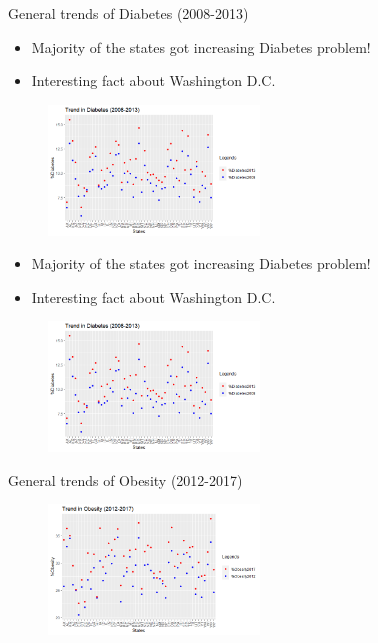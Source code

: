 \documentclass{beamer} %
\begin{document}
\begin{frame}{General trends of Diabetes (2008-2013)}

  \begin{itemize}
    \item Majority of the states got increasing Diabetes problem!
    \item Interesting fact about Washington D.C.
  \end{itemize}
  \begin{figure}
    \includegraphics[width=0.5\textwidth]{DiaTrend.png}
    \hfill
  \end{figure}

 \begin{itemize}
  \item Majority of the states got increasing Diabetes problem!
  \item Interesting fact about Washington D.C.
 \end{itemize}
   \begin{figure}
    \includegraphics[width=0.5\textwidth]{DiaTrend.png}
    \hfill
   \end{figure}
\end{frame}
\begin{frame}{General trends of Obesity (2012-2017)}
 \begin{figure}
   \includegraphics[width=0.5\textwidth]{ObesityTrend.png}
   \hfill
 \end{figure}
\end{frame}
\end{document}
